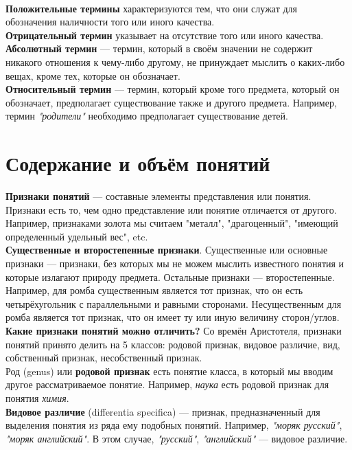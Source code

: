 \documentclass{article}
\begin{document}
\\
\textbf{Положительные термины} характеризуются тем, что они служат для обозначения наличности того или иного качества.
\\
\textbf{Отрицательный термин} указывает на отсутствие того или иного качества.
\\
\textbf{Абсолютный термин} --- термин, который в своём значении не содержит никакого отношения к чему-либо другому, не принуждает мыслить о каких-либо вещах, кроме тех, которые он обозначает.
\\
\textbf{Относительный термин} --- термин, который кроме того предмета, который он обозначает, предполагает существование также и другого предмета. Например, термин \textit{"родители"} необходимо предполагает существование детей.

\section{Содержание и объём понятий}
\textbf{Признаки понятий} --- составные элементы представления или понятия. Признаки есть то, чем одно представление или понятие отличается от другого. Например, признаками золота мы считаем "металл", "драгоценный", "имеющий определенный удельный вес", etc.
\\
\textbf{Существенные и второстепенные признаки}. Существенные или основные признаки --- признаки, без которых мы не можем мыслить известного понятия и которые излагают природу предмета. Остальные признаки --- второстепенные. Например, для ромба существенным является тот признак, что он есть четырёхугольник с параллельными и равными сторонами. Несущественным для ромба является тот признак, что он имеет ту или иную величину сторон/углов.
\\
\textbf{Какие признаки понятий можно отличить?} Со времён Аристотеля, признаки понятий принято делить на 5 классов: родовой признак, видовое различие, вид, собственный признак, несобственный признак.
\\
Род (genus) или \textbf{родовой признак} есть понятие класса, в который мы вводим другое рассматриваемое понятие. Например, \textit{наука} есть родовой признак для понятия \textit{химия}.
\\
\textbf{Видовое различие} (differentia specifica) --- признак, предназначенный для выделения понятия из ряда ему подобных понятий. Например, \textit{"моряк русский"}, \textit{"моряк английский"}. В этом случае, \textit{"русский"}, \textit{"английский"} --- видовое различие.
\\
\end{document}
